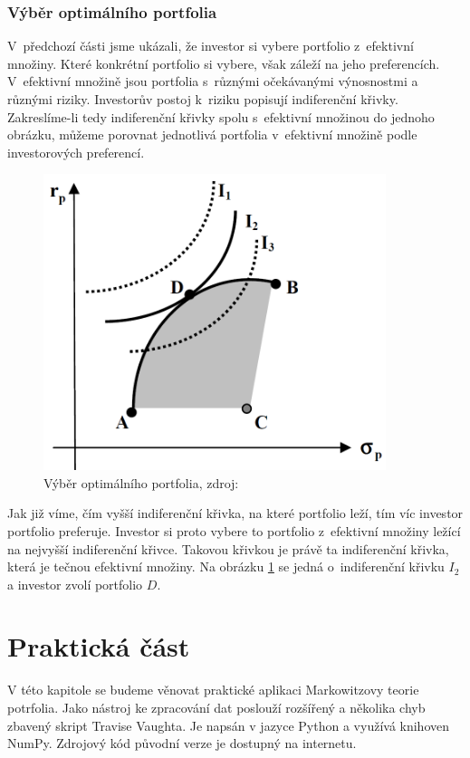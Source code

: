 \documentclass[12pt,a4paper]{report}
\begin{document}
\subsection{Výběr optimálního portfolia}
V~předchozí části jsme ukázali, že investor si vybere portfolio z~efektivní množiny. Které konkrétní portfolio si vybere, však záleží na jeho preferencích. V~efektivní množině jsou portfolia s~různými očekávanými výnosnostmi a různými riziky. Investorův postoj k~riziku popisují indiferenční křivky. Zakreslíme-li tedy indiferenční křivky spolu s~efektivní množinou do jednoho obrázku, můžeme porovnat jednotlivá portfolia v~efektivní množině podle investorových preferencí.

\begin{figure}[htb]
\centering
\includegraphics[width=10cm]{vyber.png}
\caption{Výběr optimálního portfolia, zdroj: \cite{camsky} \label{vyber}}
\end{figure}

Jak již víme, čím vyšší indiferenční křivka, na které portfolio leží, tím víc investor portfolio preferuje. Investor si proto vybere to portfolio z~efektivní množiny ležící na nejvyšší indiferenční křivce. Takovou křivkou je právě ta indiferenční křivka, která je tečnou efektivní množiny. Na obrázku \ref{vyber} se jedná o~indiferenční křivku $I_2$ a investor zvolí portfolio $D$.

\chapter{Praktická část}
  V této kapitole se budeme věnovat praktické aplikaci Markowitzovy teorie potrfolia. Jako nástroj ke zpracování dat poslouží rozšířený a několika chyb zbavený skript Travise Vaughta\cite{tvaught}. Je napsán v jazyce Python a využívá knihoven NumPy. Zdrojový kód původní verze je dostupný na internetu\cite{source}.
  
\end{document}

